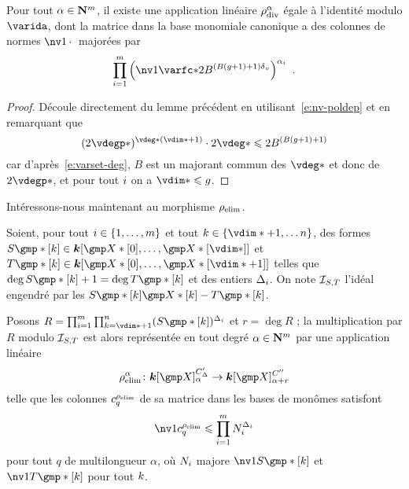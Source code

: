 \begin{coro} \label{c:hmat-rdiv}
  Pour tout \( \alpha \in {\mathbf{N}}^m \), il existe une application linéaire \(
    \rho\sb{\mathrm{div }}^\alpha \) égale à l'identité modulo \( \varida \), dont la matrice
  dans la base monomiale canonique a des colonnes de normes \( \nv1\truc \)
  majorées par
  \begin{equation}
    \prod\fctrange \left(
    \nv1{ \varfc* }
    2 B^{(B(\genre+1) + 1)\dv}
  \right) ^{ \alpha_\fct }
  \pmm.
  \end{equation}
\end{coro}

\begin{proof}
  Découle directement du lemme précédent en utilisant~\eqref{e:nv-poldep} et
  en remarquant que
  \begin{equation}
    ( 2 \vdegp* )^{\vdeg* (\vdim* + 1)} \cdot 2 \vdeg*
    \le
    2 B^{(B(\genre+1) + 1)}
  \end{equation}
  car d'après~\eqref{e:varset-deg}, \( B \) est un majorant commun des \(
    \vdeg* \) et donc de \( 2\vdegp* \), et pour tout \( i \) on a \(
    \vdim* \le \genre \).
\end{proof}

Intéressons-nous maintenant au morphisme \( \rho\sb{\mathrm{elim}} \).

\begin{lem}
  Soient, pour tout \( i \in \{ 1, \dots, m \} \) et tout \( \ind \in
  \{ \vdim* + 1, \dots \dimp \} \), des formes
  \( S\mexp*[\ind] \in \cdn [ \vmp*[0], \dots, \vmp*[\vdim*] ] \) et
  \( T\mexp*[\ind] \in \cdn [ \vmp*[0], \dots, \vmp*[\vdim*+1] ] \)
  telles que \( \deg S\mexp*[\ind] + 1 = \deg T\mexp*[\ind] \) et des entiers
  \( \Delta_i \). On note \( \mathcal I_{S, T} \) l'idéal engendré par les
  \( S\mexp*[\ind] \vmp*[\ind] - T\mexp*[\ind] \).

  Posons
  \( R = \prod\fctrange \prod_{\ind = \vdim*+1}^{\dimp}
    ( S\mexp*[\ind] )^{\Delta_\fct} \) et \( r = \deg R \) ; la multiplication
  par \( R \) modulo \( \mathcal I_{S, T} \) est alors représentée en tout degré
  \( \alpha \in {\mathbf{N}}^m \) par une application linéaire
  \begin{equation}
    \relim^\alpha \colon
    \cdn [\vmp]_ {\alpha}^{C'_\Delta}
    \to
    \cdn [\vmp]_ {\alpha+r}^{C''}
  \end{equation}
  telle que les colonnes \( c_q^{\rho\sb{\mathrm{elim}}} \) de sa matrice dans les bases de
  monômes satisfont
  \begin{equation}
    \nv1{ c_q^{\relim} }
    \le
    \prod\fctrange N_\fct^{\Delta_\fct}
  \end{equation}
  pour tout \( q \) de multilongueur \( \alpha \), où \( N_i \) majore
  \( \nv1{ S\mexp*[\ind] } \) et \( \nv1{ T\mexp*[\ind] } \) pour tout
  \( k \).
\end{lem}

